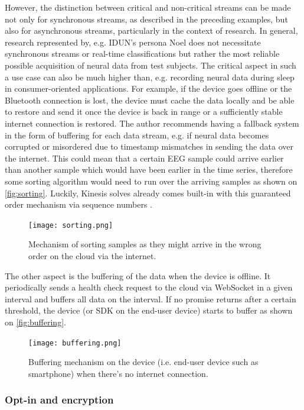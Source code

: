 However, the distinction between critical and non-critical streams can be made not only for synchronous streams, as described in the preceding examples, but also for asynchronous streams, particularly in the context of research. In general, research represented by, e.g. IDUN's persona Noel does not necessitate synchronous streams or real-time classifications but rather the most reliable possible acquisition of neural data from test subjects. The critical aspect in such a use case can also be much higher than, e.g. recording neural data during sleep in consumer-oriented applications. For example, if the device goes offline or the Bluetooth connection is lost, the device must cache the data locally and be able to restore and send it once the device is back in range or a sufficiently stable internet connection is restored. The author recommends having a fallback system in the form of buffering for each data stream, e.g. if neural data becomes corrupted or misordered due to timestamp mismatches in sending the data over the internet. This could mean that a certain EEG sample could arrive earlier than another sample which would have been earlier in the time series, therefore some sorting algorithm would need to run over the arriving samples as shown on \autoref{fig:sorting}. Luckily, Kinesis solves already comes built-in with this guaranteed order mechanism via sequence numbers \citep{amazon_web_services_inc_amazon_nodate}.

\begin{figure}[!ht]
  \centering
  \texttt{[image: sorting.png]}
  \caption{Mechanism of sorting samples as they might arrive in the wrong order on the cloud via the internet.}
  \label{fig:sorting}
\end{figure}

The other aspect is the buffering of the data when the device is offline. It periodically sends a health check request to the cloud via WebSocket in a given interval and buffers all data on the interval. If no promise returns after a certain threshold, the device (or SDK on the end-user device) starts to buffer as shown on \autoref{fig:buffering}.

\begin{figure}[!ht]
  \centering
  \texttt{[image: buffering.png]}
  \caption{Buffering mechanism on the device (i.e. end-user device such as smartphone) when there's no internet connection.}
  \label{fig:buffering}
\end{figure}

\subsubsection{Opt-in and encryption}
\label{chapter5-opt-in-and-encryption}

